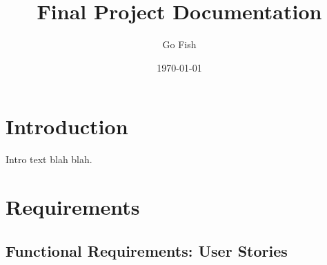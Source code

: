 \documentclass[12pt]{article}
\title{Final Project Documentation}
\author{Go Fish}
\date{\today}
\begin{document}
\maketitle

\tableofcontents
\newpage

\section{Introduction}
Intro text blah blah.

\section{Requirements}

\subsection{Functional Requirements: User Stories}
\end{document}
